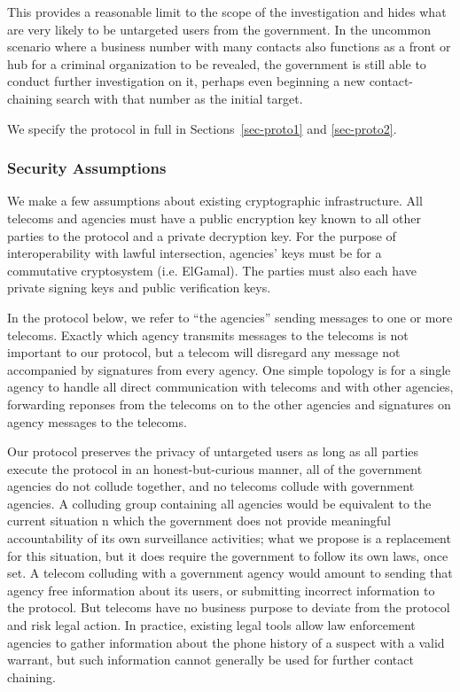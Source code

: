 This provides a reasonable limit to the scope of the investigation and hides what are very likely to be untargeted users from the government. In the uncommon scenario where a business number with many contacts also functions as a front or hub for a criminal organization to be revealed, the government is still able to conduct further investigation on it, perhaps even beginning a new contact-chaining search with that number as the initial target.

We specify the protocol in full in Sections~\ref{sec-proto1} and \ref{sec-proto2}.



\subsubsection{Security Assumptions}



We make a few assumptions about existing cryptographic infrastructure. All telecoms and agencies must have a public encryption key known to all other parties to the protocol and a private decryption key. For the purpose of interoperability with lawful intersection, agencies' keys must be for a commutative cryptosystem (i.e. ElGamal). The parties must also each have private signing keys and public verification keys.



In the protocol below, we refer to ``the agencies'' sending messages to one or more telecoms. Exactly which agency transmits messages to the telecoms is not important to our protocol, but a telecom will disregard any message not accompanied by signatures from every agency. One simple topology is for a single agency to handle all direct communication with telecoms and with other agencies, forwarding reponses from the telecoms on to the other agencies and signatures on agency messages to the telecoms.



Our protocol preserves the privacy of untargeted users as long as all parties execute the protocol in an honest-but-curious manner, all of the government agencies do not collude together, and no telecoms collude with government agencies. A colluding group containing all agencies would be equivalent to the current situation n which the government does not provide meaningful accountability of its own surveillance activities; what we propose is a replacement for this situation, but it does require the government to follow its own laws, once set. A telecom colluding with a government agency would amount to sending that agency free information about its users, or submitting incorrect information to the protocol. But telecoms have no business purpose to deviate from the protocol and risk legal action. In practice, existing legal tools allow law enforcement agencies to gather information about the phone history of a suspect with a valid warrant, but such information cannot generally be used for further contact chaining.


